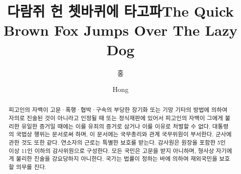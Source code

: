 \documentclass[doctor,english,final,pdfdoc]{PKNU-thesis}
\title[korean]{다람쥐 헌 쳇바퀴에 타고파}
\title[english]{The Quick Brown Fox Jumps Over The Lazy Dog}
\author[korean]{홍}{길 동}
\author[english]{Hong}{Gil Dong}
\begin{document}
 

    \makecontents

    \begin{abstract}
        {\lipsum[1]}
        {
            피고인의 자백이 고문·폭행·협박·구속의 부당한 장기화 또는 기망 기타의 방법에 의하여 자의로 진술된 것이 아니라고 인정될 때 또는 정식재판에 있어서 피고인의 자백이 그에게 불리한 유일한 증거일 때에는 이를 유죄의 증거로 삼거나 이를 이유로 처벌할 수 없다.
            대통령의 국법상 행위는 문서로써 하며, 이 문서에는 국무총리와 관계 국무위원이 부서한다. 
            군사에 관한 것도 또한 같다. 
            연소자의 근로는 특별한 보호를 받는다. 
            감사원은 원장을 포함한 5인 이상 11인 이하의 감사위원으로 구성한다. 
            모든 국민은 고문을 받지 아니하며, 형사상 자기에게 불리한 진술을 강요당하지 아니한다. 
            국가는 법률이 정하는 바에 의하여 재외국민을 보호할 의무를 진다.
        }
    \end{abstract}


	
	
	
	
	
	

    \printbibliography
\end{document}
